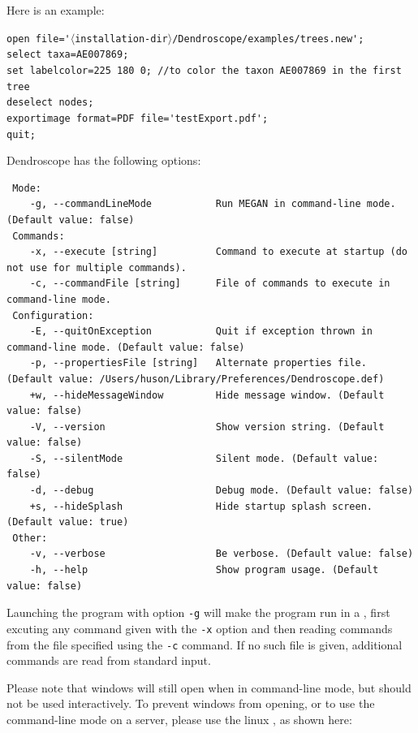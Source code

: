 \documentclass[11pt]{article}
\def\Dendroscope{{\sf Dendroscope }}
\begin{document}
Here is an example:

\verb"open file='"$\langle$\verb"installation-dir"$\rangle$\verb"/Dendroscope/examples/trees.new';"\\
\verb"select taxa=AE007869;"\\
\verb"set labelcolor=225 180 0; //to color the taxon AE007869 in the first tree"\\
\verb"deselect nodes;"\\
\verb"exportimage format=PDF file='testExport.pdf';"\\
\verb"quit;"


\Dendroscope has the following  options:

\begin{verbatim}
 Mode:
	-g, --commandLineMode           Run MEGAN in command-line mode. (Default value: false)
 Commands:
	-x, --execute [string]          Command to execute at startup (do not use for multiple commands). 
	-c, --commandFile [string]      File of commands to execute in command-line mode. 
 Configuration:
	-E, --quitOnException           Quit if exception thrown in command-line mode. (Default value: false)
	-p, --propertiesFile [string]   Alternate properties file. (Default value: /Users/huson/Library/Preferences/Dendroscope.def)
	+w, --hideMessageWindow         Hide message window. (Default value: false)
	-V, --version                   Show version string. (Default value: false)
	-S, --silentMode                Silent mode. (Default value: false)
	-d, --debug                     Debug mode. (Default value: false)
	+s, --hideSplash                Hide startup splash screen. (Default value: true)
 Other:
	-v, --verbose                   Be verbose. (Default value: false)
	-h, --help                      Show program usage. (Default value: false)
\end{verbatim}

Launching the program with option {\tt -g} will make the program run
in a , first excuting any
command given with the {\tt -x} option and then reading
commands from the file specified using the {\tt -c} command.
If no such file is given, additional commands are read from standard input.

Please note that windows will still open when in command-line mode, but should not be used interactively.
To prevent windows from opening, or to use the command-line mode on a server, please use the linux ,
as shown here:
\end{document}
